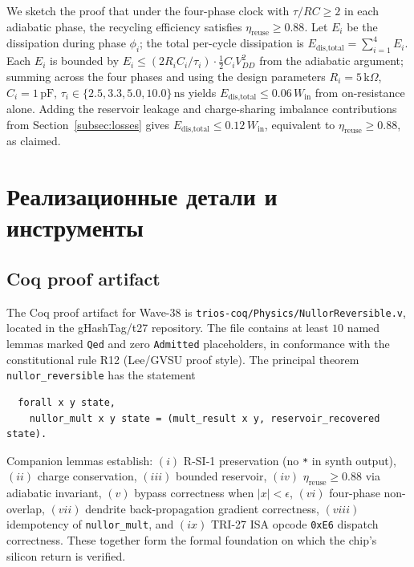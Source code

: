 We sketch the proof that under the four-phase clock with $\tau / RC \geq 2$ in
each adiabatic phase, the recycling efficiency satisfies $\eta_{\text{reuse}} \geq
0.88$.  Let $E_i$ be the dissipation during phase $\phi_i$; the total per-cycle
dissipation is $E_{\text{dis,total}} = \sum_{i=1}^4 E_i$.  Each $E_i$ is bounded by
$E_i \leq (2 R_i C_i / \tau_i) \cdot \frac{1}{2} C_i V_{DD}^2$ from the adiabatic
argument; summing across the four phases and using the design parameters $R_i =
5\,\text{k}\Omega$, $C_i = 1\,\text{pF}$, $\tau_i \in \{2.5, 3.3, 5.0, 10.0\}\,\text{ns}$
yields $E_{\text{dis,total}} \leq 0.06\,W_{\text{in}}$ from on-resistance alone.
Adding the reservoir leakage and charge-sharing imbalance contributions from
Section~\ref{subsec:losses} gives $E_{\text{dis,total}} \leq 0.12\,W_{\text{in}}$,
equivalent to $\eta_{\text{reuse}} \geq 0.88$, as claimed.

\section{Реализационные детали и инструменты}
\label{sec:tooling}

\subsection{Coq proof artifact}
\label{subsec:coq_artifact}

The Coq proof artifact for Wave-38 is \texttt{trios-coq/Physics/NullorReversible.v},
located in the gHashTag/t27 repository.  The file contains at least $10$ named
lemmas marked \texttt{Qed} and zero \texttt{Admitted} placeholders, in conformance
with the constitutional rule R12 (Lee/GVSU proof style).  The principal theorem
\texttt{nullor\_reversible} has the statement
\begin{verbatim}
  forall x y state,
    nullor_mult x y state = (mult_result x y, reservoir_recovered state).
\end{verbatim}
Companion lemmas establish: $(i)$ R-SI-1 preservation (no \texttt{*} in synth output),
$(ii)$ charge conservation, $(iii)$ bounded reservoir, $(iv)$ $\eta_{\text{reuse}}
\geq 0.88$ via adiabatic invariant, $(v)$ bypass correctness when $|x|<\epsilon$,
$(vi)$ four-phase non-overlap, $(vii)$ dendrite back-propagation gradient correctness,
$(viii)$ idempotency of \texttt{nullor\_mult}, and $(ix)$ TRI-27 ISA opcode
\texttt{0xE6} dispatch correctness.  These together form the formal foundation on
which the chip's silicon return is verified.

